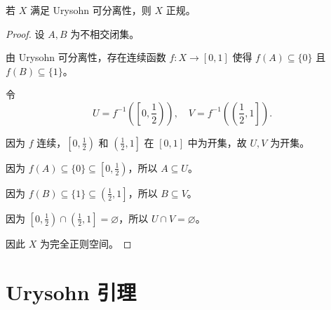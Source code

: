 \documentclass[lang=cn,a4paper,newtx,figureplace=section,tableplace=section]{elegantbook}
\begin{document}
\begin{proposition}\label{prop:urysohn-implies-normal}
若 $X$ 满足 Urysohn 可分离性，则 $X$ 正规。
\end{proposition}
\begin{proof}
设 $A, B$ 为不相交闭集。

由 Urysohn 可分离性，存在连续函数 $f: X \to [0,1]$ 使得 $f(A) \subseteq \{0\}$ 且 $f(B) \subseteq \{1\}$。

令
\begin{equation}
U = f^{-1}\left(\left[0, \frac{1}{2}\right)\right), \quad V = f^{-1}\left(\left(\frac{1}{2}, 1\right]\right).
\end{equation}

因为 $f$ 连续，$\left[0, \frac{1}{2}\right)$ 和 $\left(\frac{1}{2}, 1\right]$ 在 $[0,1]$ 中为开集，故 $U, V$ 为开集。

因为 $f(A) \subseteq \{0\} \subseteq \left[0, \frac{1}{2}\right)$，所以 $A \subseteq U$。

因为 $f(B) \subseteq \{1\} \subseteq \left(\frac{1}{2}, 1\right]$，所以 $B \subseteq V$。

因为 $\left[0, \frac{1}{2}\right) \cap \left(\frac{1}{2}, 1\right] = \varnothing$，所以 $U \cap V = \varnothing$。

因此 $X$ 为完全正则空间。
\end{proof}

\section{Urysohn 引理}
\end{document}
